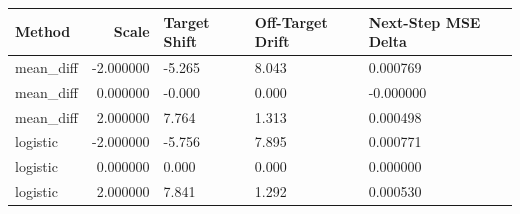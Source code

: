 \begin{tabular}{lrlll}
\toprule
Method & Scale & Target Shift & Off-Target Drift & Next-Step MSE Delta \\
\midrule
mean\_diff & -2.000000 & -5.265 & 8.043 & 0.000769 \\
mean\_diff & 0.000000 & -0.000 & 0.000 & -0.000000 \\
mean\_diff & 2.000000 & 7.764 & 1.313 & 0.000498 \\
logistic & -2.000000 & -5.756 & 7.895 & 0.000771 \\
logistic & 0.000000 & 0.000 & 0.000 & 0.000000 \\
logistic & 2.000000 & 7.841 & 1.292 & 0.000530 \\
\bottomrule
\end{tabular}
